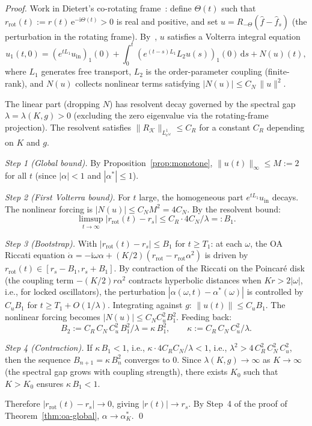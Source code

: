 \documentclass[11pt,a4paper]{article}
\theoremstyle{definition}
\begin{document}
\begin{proof}
Work in Dietert's co-rotating frame~\cite{dietert2017}: define $\Theta(t)$ such that $r_{\mathrm{rot}}(t) := r(t)\,\mathrm{e}^{-\mathrm{i}\Theta(t)} > 0$ is real and positive, and set $u = R_{-\Theta}(\hat{f} - \hat{f}_s)$ (the perturbation in the rotating frame). By~\cite{dietert2017}, $u$ satisfies a Volterra integral equation
\begin{equation}\label{eq:volterra-nl}
u_1(t,0) = (e^{tL_1}u_{\mathrm{in}})_1(0) + \int_0^t (e^{(t-s)L_1}L_2 u(s))_1(0)\,\mathrm{d}s + N(u)(t),
\end{equation}
where $L_1$ generates free transport, $L_2$ is the order-parameter coupling (finite-rank), and $N(u)$ collects nonlinear terms satisfying $|N(u)| \leq C_N\,\|u\|^2$.

The linear part (dropping $N$) has resolvent decay governed by the spectral gap $\lambda = \lambda(K,g) > 0$ (excluding the zero eigenvalue via the rotating-frame projection). The resolvent satisfies $\|R_\mathcal{K}\|_{L^1_{e^{\lambda t}}} \leq C_R$ for a constant $C_R$ depending on $K$ and $g$.

\emph{Step 1 (Global bound).} By Proposition~\ref{prop:monotone}, $\|u(t)\|_\infty \leq M := 2$ for all $t$ (since $|\alpha| < 1$ and $|\alpha^*| \leq 1$).

\emph{Step 2 (First Volterra bound).} For $t$ large, the homogeneous part $e^{tL_1}u_{\mathrm{in}}$ decays. The nonlinear forcing is $|N(u)| \leq C_N M^2 = 4C_N$. By the resolvent bound:
\[
\limsup_{t \to \infty} |r_{\mathrm{rot}}(t) - r_s| \leq C_R \cdot 4C_N / \lambda =: B_1.
\]

\emph{Step 3 (Bootstrap).} With $|r_{\mathrm{rot}}(t) - r_s| \leq B_1$ for $t \geq T_1$: at each $\omega$, the OA Riccati equation $\dot{\alpha} = -\mathrm{i}\omega\alpha + (K/2)(r_{\mathrm{rot}} - r_{\mathrm{rot}}\alpha^2)$ is driven by $r_{\mathrm{rot}}(t) \in [r_s - B_1, r_s + B_1]$. By contraction of the Riccati on the Poincar\'e disk (the coupling term $-(K/2)r\alpha^2$ contracts hyperbolic distances when $Kr > 2|\omega|$, i.e., for locked oscillators), the perturbation $|\alpha(\omega,t) - \alpha^*(\omega)|$ is controlled by $C_u B_1$ for $t \geq T_1 + O(1/\lambda)$. Integrating against $g$: $\|u(t)\| \leq C_u B_1$. The nonlinear forcing becomes $|N(u)| \leq C_N C_u^2 B_1^2$. Feeding back:
\[
B_2 := C_R\,C_N\,C_u^2\,B_1^2 / \lambda = \kappa\,B_1^2, \qquad \kappa := C_R\,C_N\,C_u^2/\lambda.
\]

\emph{Step 4 (Contraction).} If $\kappa\,B_1 < 1$, i.e., $\kappa \cdot 4C_R C_N/\lambda < 1$, i.e., $\lambda^2 > 4\,C_R^2\,C_N^2\,C_u^2$, then the sequence $B_{n+1} = \kappa\,B_n^2$ converges to $0$. Since $\lambda(K,g) \to \infty$ as $K \to \infty$ (the spectral gap grows with coupling strength), there exists $K_0$ such that $K > K_0$ ensures $\kappa\,B_1 < 1$.

Therefore $|r_{\mathrm{rot}}(t) - r_s| \to 0$, giving $|r(t)| \to r_s$. By Step~4 of the proof of Theorem~\ref{thm:oa-global}, $\alpha \to \alpha^*_K$. \qed
\end{proof}
\end{document}
